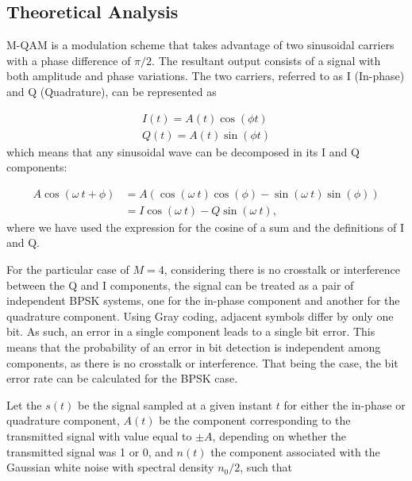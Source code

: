 
\subsection{Theoretical Analysis}

M-QAM is a modulation scheme that takes advantage of two sinusoidal carriers with a phase difference of $\pi/2$. The resultant output consists of a signal with both amplitude and phase variations. The two carriers, referred to as I (In-phase) and Q (Quadrature), can be represented as

\begin{align}
	I(t)=A(t)\cos(\phi t) \\
	Q(t)=A(t)\sin(\phi t)
\end{align}
which means that any sinusoidal wave can be decomposed in its I and Q components:

\begin{align}
	A\cos(\omega~t+\phi)&=A\left(\cos(\omega~t)\cos(\phi)-\sin(\omega~t)\sin(\phi)\right) \\
	&=I\cos(\omega~t)-Q\sin(\omega~t),
\end{align}
where we have used the expression for the cosine of a sum and the definitions of I and Q.



For the particular case of $M=4$, considering there is no crosstalk or interference between the Q and I components, the signal can be treated as a pair of independent BPSK systems, one for the in-phase component and another for the quadrature component.
Using Gray coding, adjacent symbols differ by only one bit. As such, an error in a single component leads to a single bit error.
This means that the probability of an error in bit detection is independent among components, as there is no crosstalk or interference. That being the case, the bit error rate can be calculated for the BPSK case.


Let the $s(t)$ be the signal sampled at a given instant $t$ for either the in-phase or quadrature component, $A(t)$ be the component corresponding to the transmitted signal with value equal to $\pm A$, depending on whether the transmitted signal was 1 or 0, and $n(t)$ the component associated with the Gaussian white noise with spectral density $n_0/2$, such that

